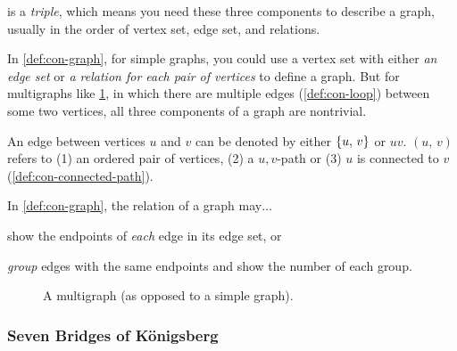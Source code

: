 \documentclass[../src/handouts/main.tex]{subfiles}
\begin{document}
 is a \textit{triple}, which means you need these three components to describe a graph, usually in the order of vertex set, edge set, and relations.

In \cref{def:con-graph}, for simple graphs, you could use a vertex set with either \textit{an edge set} or \textit{a relation for each pair of vertices} to define a graph. But for multigraphs like \cref{fig:con-graph}, in which there are multiple edges (\cref{def:con-loop}) between some two vertices, all three components of a graph are nontrivial.

An edge between vertices $u$ and $v$ can be denoted by either $\lbrace u,\, v \rbrace$ or $uv$. $(u,\, v)$ refers to (1) an ordered pair of vertices, (2) a $u,v$-path or (3) $u$ is connected to $v$ (\cref{def:con-connected-path}).

In \cref{def:con-graph}, the relation of a graph may$\ldots$
\begin{enumerate*}
  \item show the endpoints of \textit{each} edge in its edge set, or
  \item \textit{group} edges with the same endpoints and show the number of each group.
\end{enumerate*}

\begin{figure}[htbp]
  \centering
  \caption{A multigraph (as opposed to a simple graph).}
  \label{fig:con-graph}
\end{figure}

\subsubsection{Seven Bridges of Königsberg}\label{subsubsec:con-seven-bridges}
\end{document}
